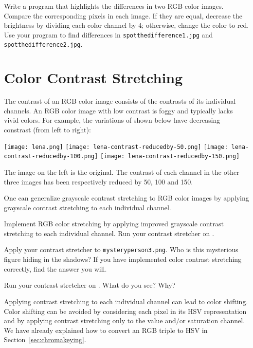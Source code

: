 \documentclass{book}
\begin{document}
\begin{exercise}
Write a program that highlights the differences in two RGB color images. Compare the corresponding pixels in each image. If they are equal, decrease the brightness by dividing each color channel by $4$; otherwise, change the color to red. Use your program to find differences in \texttt{spotthedifference1.jpg} and \texttt{spotthedifference2.jpg}.
\end{exercise}

\section{Color Contrast Stretching}\label{sec:color-contrast-stretching}
The contrast of an RGB color image consists of the contrasts of its individual channels. An RGB color image with low contrast is foggy and typically lacks vivid colors. For example, the variations of  shown below have decreasing constrast (from left to right):
\begin{center}
\texttt{[image: lena.png]}
\texttt{[image: lena-contrast-reducedby-50.png]}
\texttt{[image: lena-contrast-reducedby-100.png]}
\texttt{[image: lena-contrast-reducedby-150.png]}
\end{center}
The image on the left is the original. The contrast of each channel in the other three images has been respectively reduced by 50, 100 and 150.

One can generalize grayscale contrast stretching to RGB color images by applying grayscale contrast stretching to each individual channel. 

\begin{exercise}
Implement RGB color stretching by applying improved grayscale contrast stretching to each individual channel. Run your contrast stretcher on . 
\end{exercise}

\begin{exercise}
Apply your contrast stretcher to \texttt{mysteryperson3.png}. Who is this mysterious figure hiding in the shadows? If you have implemented color contrast stretching correctly, find the answer you will.
\end{exercise}

\begin{exercise}
Run your contrast stretcher on . What do you see? Why?
\end{exercise}

Applying contrast stretching to each individual channel can lead to color shifting. Color shifting can be avoided by considering each pixel in its HSV representation and by applying contrast stretching only to the value and/or saturation channel. We have already explained how to convert an RGB triple to HSV in Section~\ref{sec:chromakeying}.
\end{document}
